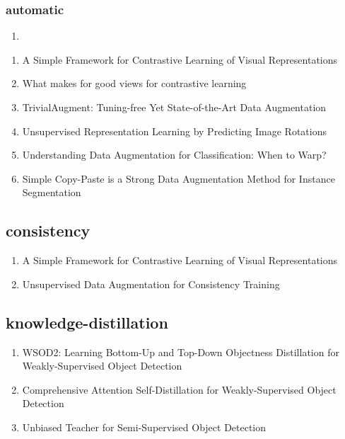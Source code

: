 \documentclass[acmlarge]{acmart}
\begin{document}
		\subsubsection{automatic}
		\begin{enumerate}
			\item
		\end{enumerate}
	\begin{enumerate}
		\item A Simple Framework for Contrastive Learning of Visual Representations \cite{Chen2020ASF} 

		\item What makes for good views for contrastive learning \cite{Tian2020WhatMF} 

		\item TrivialAugment: Tuning-free Yet State-of-the-Art Data Augmentation \cite{Mller2021TrivialAugmentTY} 

		\item Unsupervised Representation Learning by Predicting Image Rotations \cite{Gidaris2018UnsupervisedRL} 

		\item Understanding Data Augmentation for Classification: When to Warp? \cite{Wong2016UnderstandingDA} 

		\item Simple Copy-Paste is a Strong Data Augmentation Method for Instance Segmentation \cite{Ghiasi2021SimpleCI} 

	\end{enumerate}
	\subsection{consistency}
	\begin{enumerate}
		\item A Simple Framework for Contrastive Learning of Visual Representations \cite{Chen2020ASF} 

		\item Unsupervised Data Augmentation for Consistency Training \cite{Xie2020UnsupervisedDA} 

	\end{enumerate}
	\subsection{knowledge-distillation}
	\begin{enumerate}
		\item WSOD2: Learning Bottom-Up and Top-Down Objectness Distillation for Weakly-Supervised Object Detection \cite{Zeng2019WSOD2LB} 

		\item Comprehensive Attention Self-Distillation for Weakly-Supervised Object Detection \cite{Huang2020ComprehensiveAS} 

		\item Unbiased Teacher for Semi-Supervised Object Detection \cite{Liu2021UnbiasedTF} 

	\end{enumerate}
\end{document}
